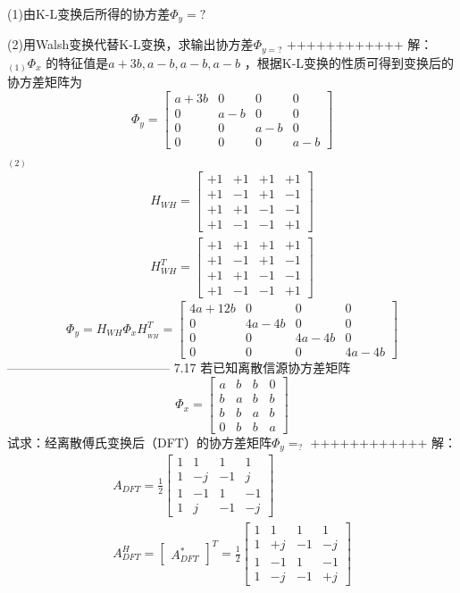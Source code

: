 \documentclass[utf8]{article}
\begin{document}
(1)由K-L变换后所得的协方差$\Phi_{y}=?$

(2)用Walsh变换代替K-L变换，求输出协方差$\Phi_{y=?}$
++++++++++++
解： $_{(1)}\Phi_{x}$ 的特征值是$a+3b,a-b,a-b,a-b$ ，根据K-L变换的性质可得到变换后的协方差矩阵为
$$\Phi_y=\begin{bmatrix}a+3b&0&0&0\\0&a-b&0&0\\0&0&a-b&0\\0&0&0&a-b\end{bmatrix}$$
$_{(2)}$$$\begin{gathered}H_{WH}=\begin{bmatrix}+1&+1&+1&+1\\+1&-1&+1&-1\\+1&+1&-1&-1\\+1&-1&-1&+1\end{bmatrix}\\H_{WH}^{T}=\begin{bmatrix}+1&+1&+1&+1\\+1&-1&+1&-1\\+1&+1&-1&-1\\+1&-1&-1&+1\end{bmatrix}\end{gathered}$$$$\Phi_y=H_{WH}\Phi_xH_{_{WH}}^T=\begin{bmatrix}4a+12b&0&0&0\\0&4a-4b&0&0\\0&0&4a-4b&0\\0&0&0&4a-4b\end{bmatrix}$$---------------------------------------
7.17 若已知离散信源协方差矩阵 $$\Phi_x=\begin{bmatrix}a&b&b&0\\b&a&b&b\\b&b&a&b\\0&b&b&a\end{bmatrix}$$试求：经离散傅氏变换后（DFT）的协方差矩阵$\Phi_{y}=_{?}$
++++++++++++
解：$$\begin{gathered}A_{DFT}=\frac{1}{2}\begin{bmatrix}1&1&1&1\\1&-j&-1&j\\1&-1&1&-1\\1&j&-1&-j\end{bmatrix}\\A_{DFT}^{H}=\begin{bmatrix}A_{DFT}^*\end{bmatrix}^T=\frac{1}{2}\begin{bmatrix}1&1&1&1\\1&+j&-1&-j\\1&-1&1&-1\\1&-j&-1&+j\end{bmatrix}\end{gathered}$$
\end{document}
